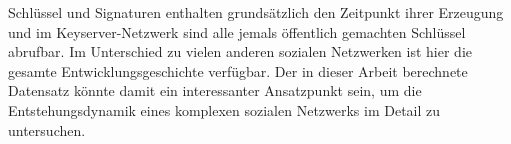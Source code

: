 \begin{itemize}
\end{itemize}

Schl\"ussel und Signaturen enthalten grunds\"atzlich den Zeitpunkt
ihrer Erzeugung und im Keyserver-Netzwerk sind alle jemals
\"offentlich gemachten Schl\"ussel abrufbar. Im Unterschied zu vielen
anderen sozialen Netzwerken ist hier die gesamte
Entwicklungsgeschichte verf\"ugbar. Der in dieser Arbeit berechnete
Datensatz k\"onnte damit ein interessanter Ansatzpunkt sein, um die
Entstehungsdynamik eines komplexen sozialen Netzwerks im Detail zu
untersuchen.

